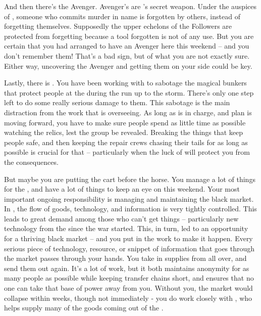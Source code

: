 \documentclass[char]{GL2020}
\begin{document}
And then there’s the Avenger. Avenger’s are \cGenesis{}’s secret weapon. Under the auspices of \cGenesis{}, someone who commits murder in \cGenesis{\their} name is forgotten by others, instead of forgetting themselves. Supposedly the upper echelons of the Followers are protected from forgetting because a tool forgotten is not of any use. But you are certain that you had arranged to have an Avenger here this weekend -- and you don’t remember them! That’s a bad sign, but of what you are not exactly sure. Either way, uncovering the Avenger and getting them on your side could be key.

Lastly, there is \cChupStudent{}. You have been working with \cChupStudent{\them} to sabotage the magical bunkers that protect people at the \pSchool{} during the run up to the storm. There’s only one step left to do some really serious damage to them. This sabotage is the \pGoaties{} main distraction from the work that \cChupLeader{} is overseeing. As long as \cChupLeader{} is in charge, and \cChupLeader{\their} plan is moving forward, you have to make sure people spend as little time as possible watching the relics, lest the group be revealed. Breaking the things that keep people safe, and then keeping the repair crews chasing their tails for as long as possible is crucial for that -- particularly when the luck of \cGenesis{} will protect you from the consequences.

But maybe you are putting the cart before the horse. You manage a lot of things for the \pGoaties{}, and have a lot of things to keep an eye on this weekend. Your most important ongoing responsibility is managing and maintaining the black market. In \pEarth{}, the flow of goods, technology, and information is very tightly controlled. This leads to great demand among those who can’t get things -- particularly new technology from the \pTech{} since the war started. This, in turn, led to an opportunity for a thriving black market -- and you put in the work to make it happen.  Every serious piece of technology, resource, or snippet of information that goes through the market passes through your hands. You take in supplies from all over, and send them out again. It’s a lot of work, but it both maintains anonymity for as many people as possible while keeping transfer chains short, and ensures that no one can take that base of power away from you. Without you, the market would collapse within weeks, though not immediately - you do work closely with \cChupInventor{}, who helps supply many of the goods coming out of the \pTech{}.
\end{document}
